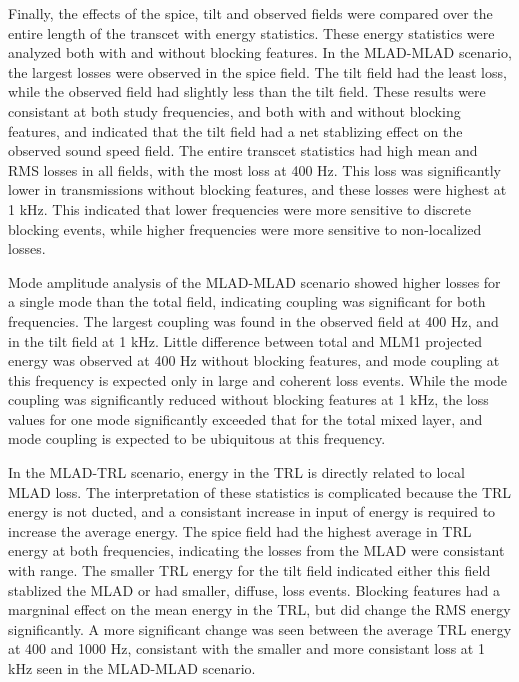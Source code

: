 \documentclass[preprint,NumberedRefs]{JASA}
\begin{document}
Finally, the effects of the spice, tilt and observed fields were compared over the entire length of the transcet with energy statistics. These energy statistics were analyzed both with and without blocking features. In the MLAD-MLAD scenario, the largest losses were observed in the spice field. The tilt field had the least loss, while the observed field had slightly less than the tilt field. These results were consistant at both study frequencies, and both with and without blocking features, and indicated that the tilt field had a net stablizing effect on the observed sound speed field. The entire transcet statistics had high mean and RMS losses in all fields, with the most loss at 400 Hz. This loss was significantly lower in transmissions without blocking features, and these losses were highest at 1 kHz. This indicated that lower frequencies were more sensitive to discrete blocking events, while higher frequencies were more sensitive to non-localized losses.

Mode amplitude analysis of the MLAD-MLAD scenario showed higher losses for a single mode than the total field, indicating coupling was significant for both frequencies. The largest coupling was found in the observed field at 400 Hz, and in the tilt field at 1 kHz. Little difference between total and MLM1 projected energy was observed at 400 Hz without blocking features, and mode coupling at this frequency is expected only in large and coherent loss events. While the mode coupling was significantly reduced without blocking features at 1 kHz, the loss values for one mode significantly exceeded that for the total mixed layer, and mode coupling is expected to be ubiquitous at this frequency.

In the MLAD-TRL scenario, energy in the TRL is directly related to local MLAD loss. The interpretation of these statistics is complicated because the TRL energy is not ducted, and a consistant increase in input of energy is required to increase the average energy. The spice field had the highest average in TRL energy at both frequencies, indicating the losses from the MLAD were consistant with range. The smaller TRL energy for the tilt field indicated either this field stablized the MLAD or had smaller, diffuse, loss events. Blocking features had a margninal effect on the mean energy in the TRL, but did change the RMS energy significantly. A more significant change was seen between the average TRL energy at 400 and 1000 Hz, consistant with the smaller and more consistant loss at 1 kHz seen in the MLAD-MLAD scenario.
\end{document}
